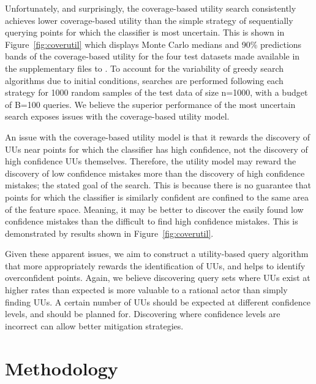 \documentclass[letterpaper]{article} %
\begin{document}
Unfortunately, and surprisingly, the coverage-based utility search consistently achieves lower coverage-based utility than the simple strategy of sequentially querying points for which the classifier is most uncertain.  This is shown in Figure~\ref{fig:coverutil} which displays Monte Carlo medians and 90\% predictions bands of the coverage-based utility for the four test datasets made available in the supplementary files to \citet{Bansal2018}.  To account for the variability of greedy search algorithms due to initial conditions, searches are performed following each strategy for 1000 random samples of the test data of size n=1000, with a budget of B=100 queries.  We believe the superior performance of the most uncertain search exposes issues with the coverage-based utility model.  

An issue with the coverage-based utility model is that it rewards the discovery of UUs near points for which the classifier has high confidence, not the discovery of high confidence UUs themselves.  Therefore, the utility model may reward the discovery of low confidence mistakes more than the discovery of high confidence mistakes; the stated goal of the search. This is because there is no guarantee that points for which the classifier is similarly confident are confined to the same area of the feature space.  Meaning, it may be better to discover the easily found low confidence mistakes than the difficult to find high confidence mistakes. This is demonstrated by results shown in Figure~\ref{fig:coverutil}. 

Given these apparent issues, we aim to construct a utility-based query algorithm that more appropriately rewards the identification of UUs, and helps to identify overconfident points. Again, we believe discovering query sets where UUs exist at higher rates than expected is more valuable to a rational actor than simply finding UUs.  A certain number of UUs should be expected at different confidence levels, and should be planned for.  Discovering where confidence levels are incorrect can allow better mitigation strategies. 

\section{Methodology}
\end{document}
